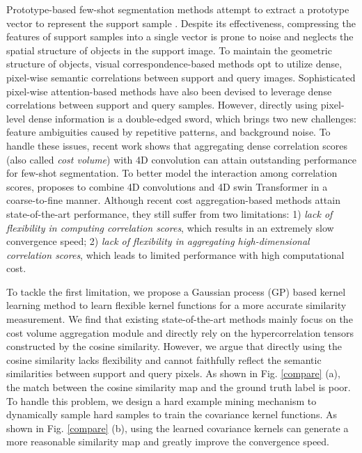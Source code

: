 \documentclass[runningheads]{llncs}
\begin{document}
Prototype-based few-shot segmentation methods attempt to extract a prototype vector to represent the support sample \cite{wang2021variational,sun2021attentional,yang2020prototype}.
Despite its effectiveness, compressing the features of support samples into a single vector is prone to noise and neglects the spatial structure of objects in the support image. To maintain the geometric structure of objects, visual correspondence-based methods \cite{min2021hypercorrelation,hu2019attention,zhang2019pyramid} opt to utilize dense, pixel-wise semantic correlations between support and query images. Sophisticated pixel-wise attention-based methods \cite{zhang2021few} have also been devised to leverage dense correlations between support and query samples. However, directly using pixel-level dense information is a double-edged sword, which brings two new challenges: feature ambiguities caused by repetitive patterns, and background noise. To handle these issues, recent work \cite{min2021hypercorrelation} shows that aggregating dense correlation scores (also called \emph{cost volume}) with 4D convolution can attain outstanding performance for few-shot segmentation. To better model the interaction among correlation scores, \cite{hong2021cost} proposes to combine 4D convolutions and 4D swin Transformer \cite{liu2021swin} in a coarse-to-fine manner. Although recent cost aggregation-based methods \cite{min2021hypercorrelation,hong2021cost} attain state-of-the-art performance, they still suffer from two limitations: 1) \emph{lack of flexibility in computing correlation scores}, which results in an extremely slow convergence speed; 2) \emph{lack of flexibility in aggregating high-dimensional correlation scores}, which leads to limited performance with high computational cost.

To tackle the first limitation, we propose a Gaussian process (GP) based kernel learning method to learn flexible kernel functions for a more accurate similarity measurement. We find that existing state-of-the-art methods \cite{min2021hypercorrelation,hong2021cost} mainly focus on the cost volume aggregation module and directly rely on the hypercorrelation tensors constructed by the cosine similarity. However, we argue that directly using the cosine similarity lacks flexibility and cannot faithfully reflect the semantic similarities between support and query pixels. As shown in Fig. \ref{compare} (a), the match between the cosine similarity map and the ground truth label is poor. To handle this problem, we design a hard example mining mechanism to dynamically sample hard samples to train the covariance kernel functions. As shown in Fig. \ref{compare} (b), using the learned covariance kernels can generate a more reasonable similarity map and greatly improve the convergence speed.
\end{document}

